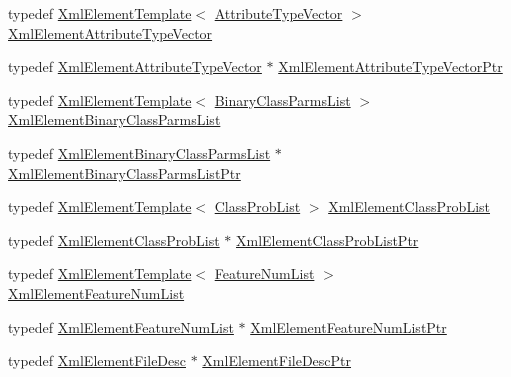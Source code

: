 \begin{DoxyCompactItemize}
\item 
typedef \hyperlink{class_k_k_b_1_1_xml_element_template}{Xml\+Element\+Template}$<$ \hyperlink{class_k_k_m_l_l_1_1_attribute_type_vector}{Attribute\+Type\+Vector} $>$ \hyperlink{namespace_k_k_m_l_l_a1ccbd28bdf9fa8ab7c102256debc760a}{Xml\+Element\+Attribute\+Type\+Vector}
\item 
typedef \hyperlink{namespace_k_k_m_l_l_a1ccbd28bdf9fa8ab7c102256debc760a}{Xml\+Element\+Attribute\+Type\+Vector} $\ast$ \hyperlink{namespace_k_k_m_l_l_aa7746fb63f9f6681844ce4c35072b75a}{Xml\+Element\+Attribute\+Type\+Vector\+Ptr}
\item 
typedef \hyperlink{class_k_k_b_1_1_xml_element_template}{Xml\+Element\+Template}$<$ \hyperlink{class_k_k_m_l_l_1_1_binary_class_parms_list}{Binary\+Class\+Parms\+List} $>$ \hyperlink{namespace_k_k_m_l_l_a89ae108d23713fb8f26f6954c70d5cf6}{Xml\+Element\+Binary\+Class\+Parms\+List}
\item 
typedef \hyperlink{namespace_k_k_m_l_l_a89ae108d23713fb8f26f6954c70d5cf6}{Xml\+Element\+Binary\+Class\+Parms\+List} $\ast$ \hyperlink{namespace_k_k_m_l_l_a28345267a8dd6b1310330e6a9c841bf9}{Xml\+Element\+Binary\+Class\+Parms\+List\+Ptr}
\item 
typedef \hyperlink{class_k_k_b_1_1_xml_element_template}{Xml\+Element\+Template}$<$ \hyperlink{class_k_k_m_l_l_1_1_class_prob_list}{Class\+Prob\+List} $>$ \hyperlink{namespace_k_k_m_l_l_a590810bfbb25bef1964a45832dacea2e}{Xml\+Element\+Class\+Prob\+List}
\item 
typedef \hyperlink{namespace_k_k_m_l_l_a590810bfbb25bef1964a45832dacea2e}{Xml\+Element\+Class\+Prob\+List} $\ast$ \hyperlink{namespace_k_k_m_l_l_a99077fb1ba171c086f8bc1d8feb1d190}{Xml\+Element\+Class\+Prob\+List\+Ptr}
\item 
typedef \hyperlink{class_k_k_b_1_1_xml_element_template}{Xml\+Element\+Template}$<$ \hyperlink{class_k_k_m_l_l_1_1_feature_num_list}{Feature\+Num\+List} $>$ \hyperlink{namespace_k_k_m_l_l_aab39b3abe8386108dfce16438bfb5ecf}{Xml\+Element\+Feature\+Num\+List}
\item 
typedef \hyperlink{namespace_k_k_m_l_l_aab39b3abe8386108dfce16438bfb5ecf}{Xml\+Element\+Feature\+Num\+List} $\ast$ \hyperlink{namespace_k_k_m_l_l_ae82159171efc6f7ff8f7b74b512556ef}{Xml\+Element\+Feature\+Num\+List\+Ptr}
\item 
typedef \hyperlink{class_k_k_m_l_l_1_1_xml_element_file_desc}{Xml\+Element\+File\+Desc} $\ast$ \hyperlink{namespace_k_k_m_l_l_aae191e962cb28af7834276b68ee1d506}{Xml\+Element\+File\+Desc\+Ptr}
\item 

\end{DoxyCompactItemize}
